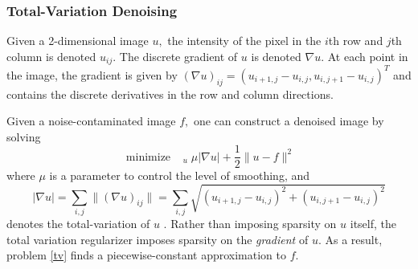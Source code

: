 \documentclass{amsart}
\newcommand{\half}{\frac{1}{2}}
\newcommand{\eqn}[2]{\begin{equation}\label{#1}#2\end{equation}}
\DeclareMathOperator*{\minimize}{minimize\quad}
\theoremstyle{definition}
\begin{document}
\subsubsection{Total-Variation Denoising} \label{sec:tv}
Given a 2-dimensional image $u,$ the intensity of the pixel in the $i$th row and $j$th column is denoted $u_{ij}.$  The discrete gradient of $u$ is denoted $\nabla u.$  At each point in the image, the gradient is given by $(\nabla u)_{ij} = (u_{i+1,j}-u_{i,j},u_{i,j+1}-u_{i,j})^T$ and contains the discrete derivatives in the row and column directions.

 Given a noise-contaminated image $f,$ one can construct a denoised image by solving
\eqn{tv}{
\minimize_u \mu |\nabla u| + \half \|u-f\|^2 
}
where $\mu$ is a parameter to control the level of smoothing, and 
\eqn{tvdef}{
|\nabla u| =\sum_{i,j} \|(\nabla u)_{ij}\| =\sum_{i,j} \sqrt{ (u_{i+1,j}-u_{i,j})^2+(u_{i,j+1}-u_{i,j})^2}
} 
denotes the total-variation of $u$ \cite{ROF92}.  Rather than imposing sparsity on $u$ itself, the total variation regularizer imposes sparsity on the {\em gradient} of $u.$  As a result, problem \eqref{tv} finds a piecewise-constant approximation to $f.$
\end{document}
